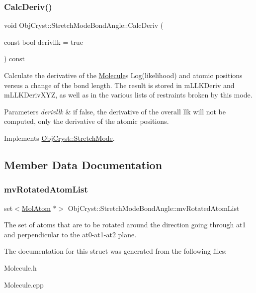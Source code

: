 \subsubsection{\texorpdfstring{CalcDeriv()}{CalcDeriv()}}
{\footnotesize\ttfamily void Obj\+Cryst\+::\+Stretch\+Mode\+Bond\+Angle\+::\+Calc\+Deriv (\begin{DoxyParamCaption}\item[{const bool}]{derivllk = {\ttfamily true} }\end{DoxyParamCaption}) const\hspace{0.3cm}{\ttfamily [virtual]}}

Calculate the derivative of the \mbox{\hyperlink{class_obj_cryst_1_1_molecule}{Molecule}}\textquotesingle{}s Log(likelihood) and atomic positions versus a change of the bond length. The result is stored in m\+L\+L\+K\+Deriv and m\+L\+L\+K\+Deriv\+X\+YZ, as well as in the various lists of restraints broken by this mode.


\begin{DoxyParams}{Parameters}
{\em derivllk} & if false, the derivative of the overall llk will not be computed, only the derivative of the atomic positions. \\
\hline
\end{DoxyParams}


Implements \mbox{\hyperlink{struct_obj_cryst_1_1_stretch_mode_a5b5ab5f9819c047a49719a330722d419}{Obj\+Cryst\+::\+Stretch\+Mode}}.



\subsection{Member Data Documentation}
\mbox{\label{struct_obj_cryst_1_1_stretch_mode_bond_angle_a1d70964f33ea3a594efd2c3a595816a6}} 
\subsubsection{\texorpdfstring{mvRotatedAtomList}{mvRotatedAtomList}}
{\footnotesize\ttfamily set$<$\mbox{\hyperlink{class_obj_cryst_1_1_mol_atom}{Mol\+Atom}} $\ast$$>$ Obj\+Cryst\+::\+Stretch\+Mode\+Bond\+Angle\+::mv\+Rotated\+Atom\+List}

The set of atoms that are to be rotated around the direction going through at1 and perpendicular to the at0-\/at1-\/at2 plane. 

The documentation for this struct was generated from the following files\+:\begin{DoxyCompactItemize}
\item 
Molecule.\+h\item 
Molecule.\+cpp\end{DoxyCompactItemize}
